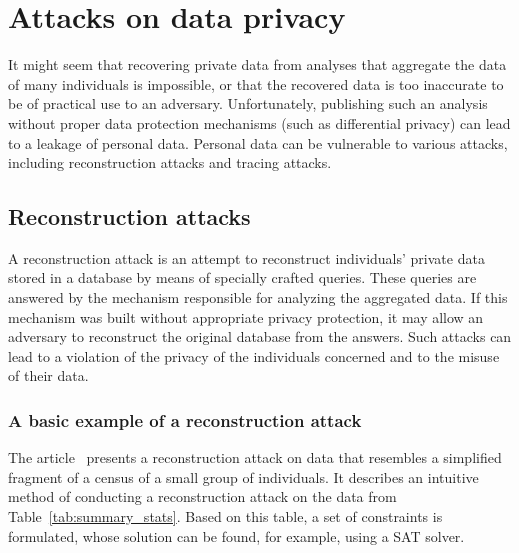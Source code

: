 \chapter{Attacks on data privacy}
\label{chap:attacks}

It might seem that recovering private data from analyses that aggregate the data of many individuals is impossible, or that the recovered data is too inaccurate to be of practical use to an adversary. Unfortunately, publishing such an analysis without proper data protection mechanisms (such as differential privacy) can lead to a leakage of personal data. Personal data can be vulnerable to various attacks, including reconstruction attacks and tracing attacks.

\section{Reconstruction attacks}

A reconstruction attack is an attempt to reconstruct individuals' private data stored in a database by means of specially crafted queries. These queries are answered by the mechanism responsible for analyzing the aggregated data. If this mechanism was built without appropriate privacy protection, it may allow an adversary to reconstruct the original database from the answers. Such attacks can lead to a violation of the privacy of the individuals concerned and to the misuse of their data.

\subsection{A basic example of a reconstruction attack}

The article~\cite{publicDataAttack} presents a reconstruction attack on data that resembles a simplified fragment of a census of a small group of individuals. It describes an intuitive method of conducting a reconstruction attack on the data from Table~\ref{tab:summary_stats}. Based on this table, a set of constraints is formulated, whose solution can be found, for example, using a SAT solver.

